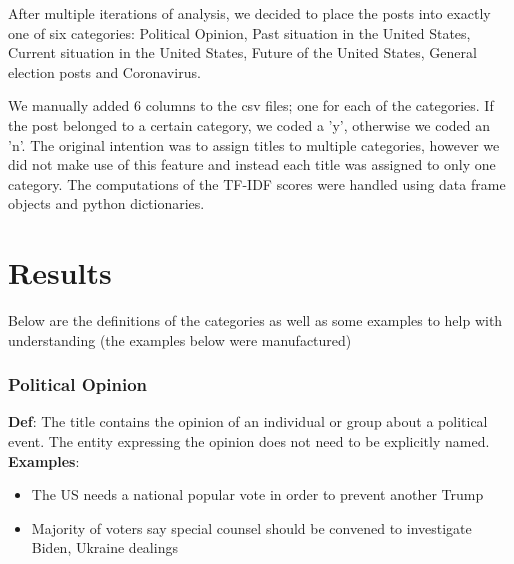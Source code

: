 \documentclass[11pt]{article}
\begin{document}
After multiple iterations of analysis, we decided to place the posts into exactly one of six categories: Political Opinion, Past situation in the United States, Current situation in the United States, Future of the United States, General election posts and Coronavirus. 

We manually added 6 columns to the csv files; one for each of the categories. If the post belonged to a certain category, we coded a 'y', otherwise we coded an 'n'. The original intention was to assign titles to multiple categories, however we did not make use of this feature and instead each title was assigned to only one category. The computations of the TF-IDF scores were handled using data frame objects and python dictionaries.


\section{Results}

 Below are the definitions of the categories as well as some examples to help with understanding (the examples below were manufactured)

\subsubsection*{Political Opinion}
\textbf{Def}: The title contains the opinion of an individual or group about a political event. The entity expressing the opinion does not need to be explicitly named.
\newline
\textbf{Examples}: 
\begin{itemize}
    \item The US needs a national popular vote in order to prevent another Trump
    \item Majority of voters say special counsel should be convened to investigate Biden, Ukraine dealings
\end{itemize}
\end{document}
